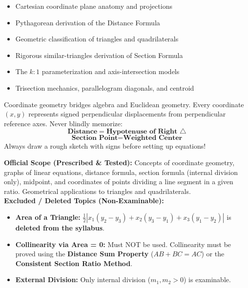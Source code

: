 \documentclass[10pt,a4paper]{article}
\begin{document}
\vspace{3mm}
\begin{minipage}[t]{0.48\textwidth}
  \begin{conceptBox}[title=What This Handbook Includes,fonttitle=\bfseries\color{navy}]
    \begin{itemize}
      \item Cartesian coordinate plane anatomy and projections
      \item Pythagorean derivation of the Distance Formula
      \item Geometric classification of triangles and quadrilaterals
      \item Rigorous similar-triangles derivation of Section Formula
      \item The $k:1$ parameterization and axis-intersection models
      \item Trisection mechanics, parallelogram diagonals, and centroid
    \end{itemize}
  \end{conceptBox}
\end{minipage}\hfill
\begin{minipage}[t]{0.48\textwidth}
  \begin{formulaBox}[title=Pedagogical Strategy: Foundations First,fonttitle=\bfseries\color{navy}]
    \raggedright Coordinate geometry bridges algebra and Euclidean geometry. Every coordinate $(x,y)$ represents signed perpendicular displacements from perpendicular reference axes. Never blindly memorize:
    $$\mathbf{\text{Distance} = \text{Hypotenuse of Right } \triangle}$$
    $$\mathbf{\text{Section Point} = \text{Weighted Center}}$$
    Always draw a rough sketch with signs before setting up equations!
  \end{formulaBox}
\end{minipage}

\vspace{1.5mm}
\begin{warningBox}[title=CBSE 2026--27 Curriculum Verification \& Rationalized Scope,fonttitle=\bfseries\color{navy}]
  \textbf{Official Scope (Prescribed \& Tested):} Concepts of coordinate geometry, graphs of linear equations, distance formula, section formula (internal division only), midpoint, and coordinates of points dividing a line segment in a given ratio. Geometrical applications to triangles and quadrilaterals.\\
  \textbf{Excluded / Deleted Topics (Non-Examinable):}
  \begin{itemize}
    \item \textbf{Area of a Triangle:} $\frac{1}{2}|x_1(y_2-y_3) + x_2(y_3-y_1) + x_3(y_1-y_2)|$ is \textbf{deleted from the syllabus}.
    \item \textbf{Collinearity via Area = 0:} Must NOT be used. Collinearity must be proved using the \textbf{Distance Sum Property} ($AB + BC = AC$) or the \textbf{Consistent Section Ratio Method}.
    \item \textbf{External Division:} Only internal division ($m_1, m_2 > 0$) is examinable.
  \end{itemize}
\end{warningBox}
\end{document}
